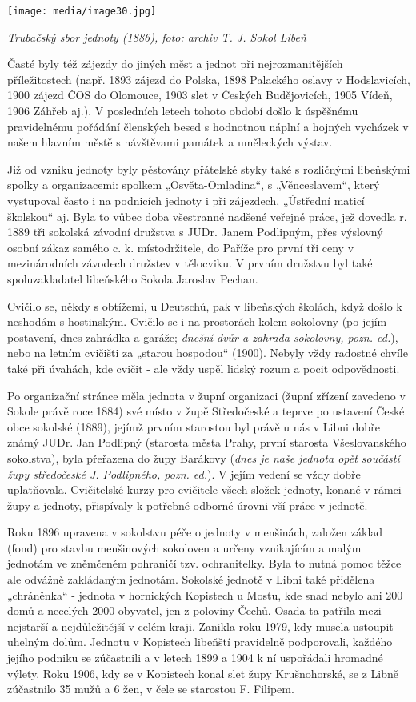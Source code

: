 \texttt{[image: media/image30.jpg]}

\emph{Trubačský sbor jednoty (1886), foto: archiv T. J. Sokol Libeň}

Časté byly též zájezdy do jiných měst a jednot při nejrozmanitějších
příležitostech (např. 1893 zájezd do Polska, 1898 Palackého oslavy v
Hodslavicích, 1900 zájezd ČOS do Olomouce, 1903 slet v Českých
Budějovicích, 1905 Vídeň, 1906 Záhřeb aj.). V posledních letech tohoto
období došlo k úspěšnému pravidelnému pořádání členských besed s
hodnotnou náplní a hojných vycházek v našem hlavním městě s návštěvami
památek a uměleckých výstav.

Již od vzniku jednoty byly pěstovány přátelské styky také s rozličnými
libeňskými spolky a organizacemi: spolkem „Osvěta-Omladina``, s
„Věnceslavem``, který vystupoval často i na podnicích jednoty i při
zájezdech, „Ústřední maticí školskou`` aj. Byla to vůbec doba všestranné
nadšené veřejné práce, jež dovedla r. 1889 tři sokolská závodní družstva
s JUDr. Janem Podlipným, přes výslovný osobní zákaz samého c. k.
místodržitele, do Paříže pro první tři ceny v mezinárodních závodech
družstev v tělocviku. V prvním družstvu byl také spoluzakladatel
libeňského Sokola Jaroslav Pechan.

Cvičilo se, někdy s obtížemi, u Deutschů, pak v libeňských školách, když
došlo k neshodám s hostinským. Cvičilo se i na prostorách kolem
sokolovny (po jejím postavení, dnes zahrádka a garáže; \emph{dnešní dvůr
a zahrada sokolovny, pozn. ed.}), nebo na letním cvičišti za „starou
hospodou`` (1900). Nebyly vždy radostné chvíle také při úvahách, kde
cvičit - ale vždy uspěl lidský rozum a pocit odpovědnosti.

Po organizační stránce měla jednota v župní organizaci (župní zřízení
zavedeno v Sokole právě roce 1884) své místo v župě Středočeské a teprve
po ustavení České obce sokolské (1889), jejímž prvním starostou byl
právě u nás v Libni dobře známý JUDr. Jan Podlipný (starosta města
Prahy, první starosta Všeslovanského sokolstva), byla přeřazena do župy
Barákovy (\emph{dnes je naše jednota opět součástí župy středočeské J.
Podlipného, pozn. ed.}). V jejím vedení se vždy dobře uplatňovala.
Cvičitelské kurzy pro cvičitele všech složek jednoty, konané v rámci
župy a jednoty, přispívaly k potřebné odborné úrovni vší práce v
jednotě.

Roku 1896 upravena v sokolstvu péče o jednoty v menšinách, založen
základ (fond) pro stavbu menšinových sokoloven a určeny vznikajícím a
malým jednotám ve zněmčeném pohraničí tzv. ochranitelky. Byla to nutná
pomoc těžce ale odvážně zakládaným jednotám. Sokolské jednotě v Libni
také přidělena „chráněnka`` - jednota v hornických Kopistech u Mostu,
kde snad nebylo ani 200 domů a necelých 2000 obyvatel, jen z poloviny
Čechů. Osada ta patřila mezi nejstarší a nejdůležitější v celém kraji.
Zanikla roku 1979, kdy musela ustoupit uhelným dolům. Jednotu v
Kopistech libeňští pravidelně podporovali, každého jejího podniku se
zúčastnili a v letech 1899 a 1904 k ní uspořádali hromadné výlety. Roku
1906, kdy se v Kopistech konal slet župy Krušnohorské, se z Libně
zúčastnilo 35 mužů a 6 žen, v čele se starostou F. Filipem.


